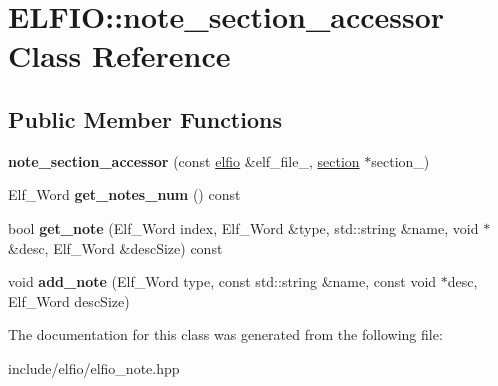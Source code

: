 \hypertarget{class_e_l_f_i_o_1_1note__section__accessor}{}\section{E\+L\+F\+IO\+:\+:note\+\_\+section\+\_\+accessor Class Reference}
\label{class_e_l_f_i_o_1_1note__section__accessor}
\subsection*{Public Member Functions}
\begin{DoxyCompactItemize}
\item 
{\bfseries note\+\_\+section\+\_\+accessor} (const \hyperlink{class_e_l_f_i_o_1_1elfio}{elfio} \&elf\+\_\+file\+\_\+, \hyperlink{class_e_l_f_i_o_1_1section}{section} $\ast$section\+\_\+)\hypertarget{class_e_l_f_i_o_1_1note__section__accessor_acf59b24a201ac408258e1b721a4065af}{}\label{class_e_l_f_i_o_1_1note__section__accessor_acf59b24a201ac408258e1b721a4065af}

\item 
Elf\+\_\+\+Word {\bfseries get\+\_\+notes\+\_\+num} () const \hypertarget{class_e_l_f_i_o_1_1note__section__accessor_ac96de265ea12f801797638f17092db76}{}\label{class_e_l_f_i_o_1_1note__section__accessor_ac96de265ea12f801797638f17092db76}

\item 
bool {\bfseries get\+\_\+note} (Elf\+\_\+\+Word index, Elf\+\_\+\+Word \&type, std\+::string \&name, void $\ast$\&desc, Elf\+\_\+\+Word \&desc\+Size) const \hypertarget{class_e_l_f_i_o_1_1note__section__accessor_afd087fe8678e7b7f05bcc69be2ed88f0}{}\label{class_e_l_f_i_o_1_1note__section__accessor_afd087fe8678e7b7f05bcc69be2ed88f0}

\item 
void {\bfseries add\+\_\+note} (Elf\+\_\+\+Word type, const std\+::string \&name, const void $\ast$desc, Elf\+\_\+\+Word desc\+Size)\hypertarget{class_e_l_f_i_o_1_1note__section__accessor_ad46e25a82332ced686adb2a1bd208d9d}{}\label{class_e_l_f_i_o_1_1note__section__accessor_ad46e25a82332ced686adb2a1bd208d9d}

\end{DoxyCompactItemize}


The documentation for this class was generated from the following file\+:\begin{DoxyCompactItemize}
\item 
include/elfio/elfio\+\_\+note.\+hpp\end{DoxyCompactItemize}
